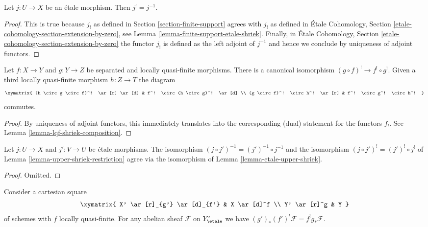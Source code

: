 \begin{lemma}
\label{lemma-etale-upper-shriek}
Let $j : U \to X$ be an \'etale morphism. Then $j^! = j^{-1}$.
\end{lemma}

\begin{proof}
This is true because $j_!$ as defined in
Section \ref{section-finite-support}
agrees with $j_!$ as defined in \'Etale Cohomology, Section
\ref{etale-cohomology-section-extension-by-zero}, see
Lemma \ref{lemma-finite-support-etale-shriek}. Finally, in
\'Etale Cohomology, Section \ref{etale-cohomology-section-extension-by-zero}
the functor $j_!$ is defined
as the left adjoint of $j^{-1}$ and hence we conclude by
uniqueness of adjoint functors.
\end{proof}

\begin{lemma}
\label{lemma-upper-shriek-restriction}
Let $f : X \to Y$ and $g : Y \to Z$ be separated and locally quasi-finite
morphisms. There is a canonical isomorphism $(g \circ f)^! \to f^! \circ g^!$.
Given a third locally quasi-finite morphism $h : Z \to T$
the diagram
$$
\xymatrix{
(h \circ g \circ f)^! \ar[r] \ar[d] &
f^! \circ (h \circ g)^! \ar[d] \\
(g \circ f)^! \circ h^! \ar[r] & f^! \circ g^! \circ h^!
}
$$
commutes.
\end{lemma}

\begin{proof}
By uniqueness of adjoint functors, this immediately translates
into the corresponding (dual) statement for the functors $f_!$.
See Lemma \ref{lemma-lqf-shriek-composition}.
\end{proof}

\begin{lemma}
\label{lemma-upper-shriek-restriction-etale}
Let $j : U \to X$ and $j' : V \to U$ be \'etale morphisms.
The isomorphism $(j \circ j')^{-1} = (j')^{-1} \circ j^{-1}$
and the isomorphism $(j \circ j')^! = (j')^! \circ j^!$ of
Lemma \ref{lemma-upper-shriek-restriction}
agree via the isomorphism of Lemma \ref{lemma-etale-upper-shriek}.
\end{lemma}

\begin{proof}
Omitted.
\end{proof}

\begin{lemma}
\label{lemma-lqf-base-change-upper-shriek}
Consider a cartesian square
$$
\xymatrix{
X' \ar[r]_{g'} \ar[d]_{f'} & X \ar[d]^f \\
Y' \ar[r]^g & Y
}
$$
of schemes with $f$ locally quasi-finite. For any abelian sheaf $\mathcal{F}$
on $Y'_\etale$ we have $(g')_*(f')^!\mathcal{F} = f^!g_*\mathcal{F}$.
\end{lemma}

